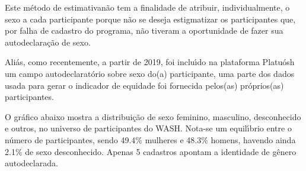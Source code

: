 \documentclass[
12pt,		%
openright,	%
twoside,  %
a4paper,			%
chapter=TITLE,		%
english,			%
french,				%
spanish,			%
brazil				%
]{USPSC-classe/USPSC}
\begin{document}
Este m\'etodo de \textquotedbl estimativa\textquotedbl  n\~ao tem a finalidade de atribuir, individualmente, o sexo a cada participante porque n\~ao se deseja estigmatizar os participantes que, por falha de cadastro do programa, n\~ao tiveram a oportunidade de fazer sua autodeclara\c{c}\~ao de sexo.










Ali\'as, como recentemente, a partir de 2019, foi inclu\'{\i}do na plataforma Platu\'osh um campo autodeclarat\'orio sobre sexo do(a) participante, uma parte dos dados usada para gerar o indicador de equidade foi fornecida pelos(as) pr\'oprios(as) participantes.










O gr\'afico abaixo mostra a distribui\c{c}\~ao de sexo feminino, masculino, desconhecido e outros, no universo de participantes do WASH. Nota-se um equil\'{\i}brio entre o n\'umero de participantes, sendo 49.4\%  mulheres e 48.3\% homens, havendo ainda 2.1\% de sexo desconhecido. Apenas 5 cadastros apontam a identidade de g\^enero autodeclarada.
\end{document}
